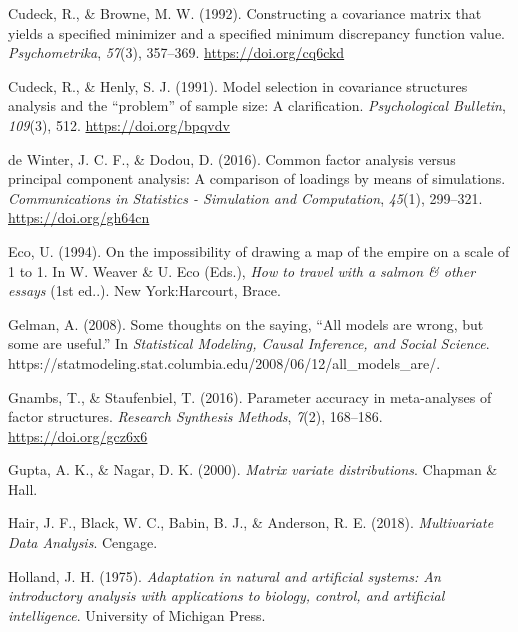 \documentclass[11pt]{umnthesis}
\newlength{\cslhangindent}
\newenvironment{CSLReferences}[2] %
 {%
  \setlength{\parindent}{0pt}
  \ifodd #1 \everypar{\setlength{\hangindent}{\cslhangindent}}\ignorespaces\fi
  \ifnum #2 > 0
  \setlength{\parskip}{#2\baselineskip}
  \fi
 }%
 {}
\begin{document}
\begin{CSLReferences}{1}{0}
\leavevmode{}%
Cudeck, R., \& Browne, M. W. (1992). Constructing a covariance matrix that yields a specified minimizer and a specified minimum discrepancy function value. \emph{Psychometrika}, \emph{57}(3), 357--369. \url{https://doi.org/cq6ckd}

\leavevmode{}%
Cudeck, R., \& Henly, S. J. (1991). Model selection in covariance structures analysis and the {``problem''} of sample size: {A} clarification. \emph{Psychological Bulletin}, \emph{109}(3), 512. \url{https://doi.org/bpqvdv}

\leavevmode{}%
de Winter, J. C. F., \& Dodou, D. (2016). Common factor analysis versus principal component analysis: {A} comparison of loadings by means of simulations. \emph{Communications in Statistics - Simulation and Computation}, \emph{45}(1), 299--321. \url{https://doi.org/gh64cn}

\leavevmode{}%
Eco, U. (1994). On the impossibility of drawing a map of the empire on a scale of 1 to 1. In W. Weaver \& U. Eco (Eds.), \emph{How to travel with a salmon \& other essays} (1st ed..). {New York:Harcourt, Brace}.

\leavevmode{}%
Gelman, A. (2008). Some thoughts on the saying, {``{All} models are wrong, but some are useful.''} In \emph{Statistical Modeling, Causal Inference, and Social Science}. https://statmodeling.stat.columbia.edu/2008/06/12/all\_models\_are/.

\leavevmode{}%
Gnambs, T., \& Staufenbiel, T. (2016). Parameter accuracy in meta-analyses of factor structures. \emph{Research Synthesis Methods}, \emph{7}(2), 168--186. \url{https://doi.org/gcz6x6}

\leavevmode{}%
Gupta, A. K., \& Nagar, D. K. (2000). \emph{Matrix variate distributions}. {Chapman \& Hall}.

\leavevmode{}%
Hair, J. F., Black, W. C., Babin, B. J., \& Anderson, R. E. (2018). \emph{Multivariate {Data Analysis}}. {Cengage}.

\leavevmode{}%
Holland, J. H. (1975). \emph{Adaptation in natural and artificial systems: {An} introductory analysis with applications to biology, control, and artificial intelligence}. {University of Michigan Press}.


\end{CSLReferences}
\end{document}

